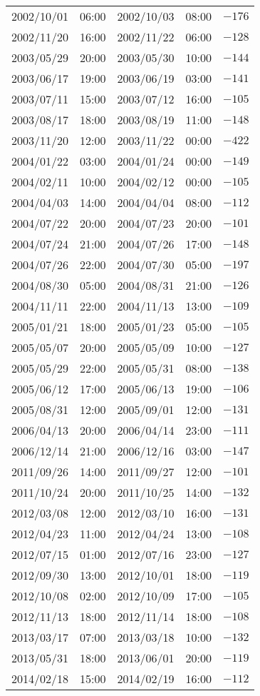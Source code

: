 \begin{table}[h]
\begin{tabular}{ccccc}
	2002/10/01 & 06:00 & 2002/10/03 & 08:00 & $ -176 $ \\
	2002/11/20 & 16:00 & 2002/11/22 & 06:00 & $ -128 $ \\
	2003/05/29 & 20:00 & 2003/05/30 & 10:00 & $ -144 $ \\
	2003/06/17 & 19:00 & 2003/06/19 & 03:00 & $ -141 $ \\
	2003/07/11 & 15:00 & 2003/07/12 & 16:00 & $ -105 $ \\
	2003/08/17 & 18:00 & 2003/08/19 & 11:00 & $ -148 $ \\
	2003/11/20 & 12:00 & 2003/11/22 & 00:00 & $ -422 $ \\
	2004/01/22 & 03:00 & 2004/01/24 & 00:00 & $ -149 $ \\
	2004/02/11 & 10:00 & 2004/02/12 & 00:00 & $ -105 $ \\
	2004/04/03 & 14:00 & 2004/04/04 & 08:00 & $ -112 $ \\
	2004/07/22 & 20:00 & 2004/07/23 & 20:00 & $ -101 $ \\
	2004/07/24 & 21:00 & 2004/07/26 & 17:00 & $ -148 $ \\
	2004/07/26 & 22:00 & 2004/07/30 & 05:00 & $ -197 $ \\
	2004/08/30 & 05:00 & 2004/08/31 & 21:00 & $ -126 $ \\
	2004/11/11 & 22:00 & 2004/11/13 & 13:00 & $ -109 $ \\
	2005/01/21 & 18:00 & 2005/01/23 & 05:00 & $ -105 $ \\
	2005/05/07 & 20:00 & 2005/05/09 & 10:00 & $ -127 $ \\
	2005/05/29 & 22:00 & 2005/05/31 & 08:00 & $ -138 $ \\
	2005/06/12 & 17:00 & 2005/06/13 & 19:00 & $ -106 $ \\
	2005/08/31 & 12:00 & 2005/09/01 & 12:00 & $ -131 $ \\
	2006/04/13 & 20:00 & 2006/04/14 & 23:00 & $ -111 $ \\
	2006/12/14 & 21:00 & 2006/12/16 & 03:00 & $ -147 $ \\ 
	2011/09/26 & 14:00 & 2011/09/27 & 12:00 & $ -101 $ \\
	2011/10/24 & 20:00 & 2011/10/25 & 14:00 & $ -132 $ \\
	2012/03/08 & 12:00 & 2012/03/10 & 16:00 & $ -131 $ \\
	2012/04/23 & 11:00 & 2012/04/24 & 13:00 & $ -108 $ \\
	2012/07/15 & 01:00 & 2012/07/16 & 23:00 & $ -127 $ \\
	2012/09/30 & 13:00 & 2012/10/01 & 18:00 & $ -119 $ \\
	2012/10/08 & 02:00 & 2012/10/09 & 17:00 & $ -105 $ \\
	2012/11/13 & 18:00 & 2012/11/14 & 18:00 & $ -108 $ \\
	2013/03/17 & 07:00 & 2013/03/18 & 10:00 & $ -132 $ \\
	2013/05/31 & 18:00 & 2013/06/01 & 20:00 & $ -119 $ \\
	2014/02/18 & 15:00 & 2014/02/19 & 16:00 & $ -112 $ \\ \hline
	\end{tabular}%
	\end{table}

